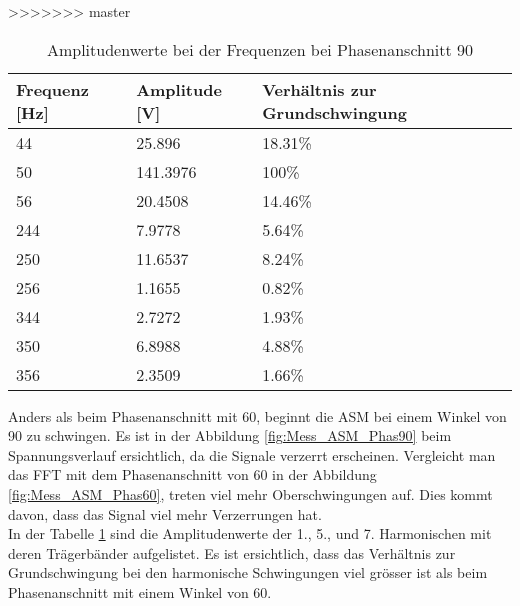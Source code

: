  


>>>>>>> master
\begin{table}[ht!]
	\centering
	\begin{tabular}{|l|l|l|}
		\hline
		Frequenz {[}Hz{]} & Amplitude {[}V{]} & Verhältnis zur Grundschwingung \\ \hline
		44                & 25.896            & 18.31\%                        \\ \hline
		50                & 141.3976          & 100\%                          \\ \hline
		56                & 20.4508           & 14.46\%                        \\ \hline
		244               & 7.9778            & 5.64\%                         \\ \hline
		250               & 11.6537           & 8.24\%                         \\ \hline
		256               & 1.1655            & 0.82\%                         \\ \hline
		344               & 2.7272            & 1.93\%                         \\ \hline
		350               & 6.8988            & 4.88\%                         \\ \hline
		356               & 2.3509            & 1.66\%                         \\ \hline
	\end{tabular}
\caption{Amplitudenwerte bei der Frequenzen bei Phasenanschnitt 90\textdegree}\label{tab:Mess_Spannung_ASM_Phas90}
\end{table}


Anders als beim Phasenanschnitt mit 60\textdegree, beginnt die ASM bei einem Winkel von 90\textdegree \hspace{0.02cm} zu schwingen. Es ist in der Abbildung \ref{fig:Mess_ASM_Phas90} beim Spannungsverlauf ersichtlich, da die Signale verzerrt erscheinen. Vergleicht man das FFT mit dem Phasenanschnitt von 60\textdegree \hspace{0.02cm} in der Abbildung \ref{fig:Mess_ASM_Phas60}, treten viel mehr Oberschwingungen auf. Dies kommt davon, dass das Signal viel mehr Verzerrungen hat.\\
In der Tabelle \ref{tab:Mess_Spannung_ASM_Phas90} sind die Amplitudenwerte der 1., 5., und 7. Harmonischen mit deren Trägerbänder aufgelistet. Es ist ersichtlich, dass das Verhältnis zur Grundschwingung bei den harmonische Schwingungen viel grösser ist als beim Phasenanschnitt mit einem Winkel von 60\textdegree. 

